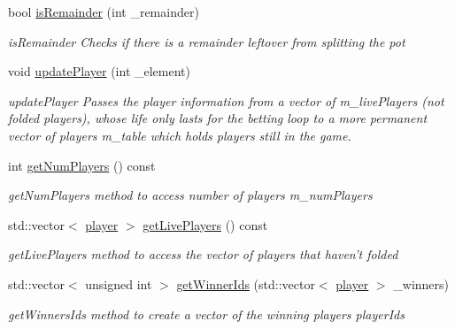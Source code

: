 \begin{DoxyCompactItemize}
bool \hyperlink{classdealerLib_a356e873aabf48a03316d7c9dd3508818}{is\-Remainder} (int \-\_\-remainder)
\begin{DoxyCompactList}\small\item\em is\-Remainder Checks if there is a remainder leftover from splitting the pot \end{DoxyCompactList}\item 
void \hyperlink{classdealerLib_aac11d5e45a71a0635e0952bd9116b9cf}{update\-Player} (int \-\_\-element)
\begin{DoxyCompactList}\small\item\em update\-Player Passes the player information from a vector of m\-\_\-live\-Players (not folded players), whose life only lasts for the betting loop to a more permanent vector of players m\-\_\-table which holds players still in the game. \end{DoxyCompactList}\item 
int \hyperlink{classdealerLib_a9d7c83f1ebcab5be17c2d3a8a81b4f9b}{get\-Num\-Players} () const 
\begin{DoxyCompactList}\small\item\em get\-Num\-Players method to access number of players m\-\_\-num\-Players \end{DoxyCompactList}\item 
std\-::vector$<$ \hyperlink{classplayer}{player} $>$ \hyperlink{classdealerLib_a94ae52ae83e14513e73abe728a71c58e}{get\-Live\-Players} () const 
\begin{DoxyCompactList}\small\item\em get\-Live\-Players method to access the vector of players that haven't folded \end{DoxyCompactList}\item 
std\-::vector$<$ unsigned int $>$ \hyperlink{classdealerLib_a35715124d438c8934448c5fa99af441f}{get\-Winner\-Ids} (std\-::vector$<$ \hyperlink{classplayer}{player} $>$ \-\_\-winners)
\begin{DoxyCompactList}\small\item\em get\-Winners\-Ids method to create a vector of the winning players player\-Ids \end{DoxyCompactList}\end{DoxyCompactItemize}
